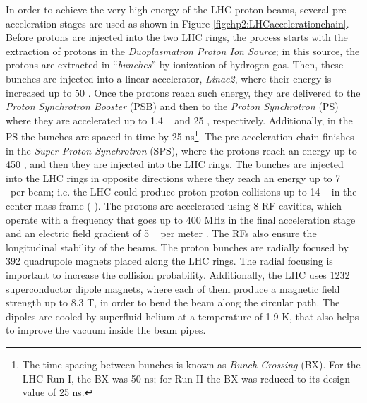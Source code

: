 In order to achieve the very high energy of the LHC proton beams, several
pre-acceleration stages are used as shown in Figure \ref{figchp2:LHCaccelerationchain}. Before 
protons are injected into the two LHC rings, the process starts 
with the extraction of protons in the \textit{Duoplasmatron 
Proton Ion Source}; in this source, the protons are extracted in ``\textit{bunches}'' 
by ionization of hydrogen gas. Then, these bunches are 
injected into a linear accelerator, \textit{Linac2}, where 
their energy is increased up to 50 \MeV. Once the protons 
reach such energy, they are delivered to the 
\textit{Proton Synchrotron Booster} (PSB) and then to the \textit{Proton Synchrotron} (PS) 
where they are accelerated up to 1.4 \GeV~ and 25 \GeV, respectively. Additionally,
in the PS the bunches are spaced in time by 25 ns\footnote[1]{The time spacing between 
bunches is known as \textit{Bunch Crossing} (BX). For the LHC Run I, the BX was 50 ns; for Run II 
the BX was reduced to its design value of 25 ns.}. The pre-acceleration chain 
finishes in the \textit{Super Proton Synchrotron} (SPS), where the protons reach 
an energy up to 450 \GeV, and then they are injected into the LHC rings. The bunches are 
injected into the LHC rings in opposite directions where they reach an 
energy up to 7 \TeV~per beam; i.e. the LHC could produce proton-proton collisions 
up to 14 \TeV~ in the center-mass frame ( \TeV). The protons are accelerated 
using 8 RF cavities, which operate with a frequency 
that goes up to 400 MHz in the final acceleration stage and an electric field 
gradient of 5 \MeV~ per meter \cite{chp2:LHCTDR}. The RFs also ensure the longitudinal stability of the beams. The 
proton bunches are radially focused by 392 quadrupole magnets placed along the 
LHC rings. The radial focusing is important to increase the collision probability. Additionally, the 
LHC uses 1232 superconductor dipole magnets, where each of them produce a magnetic field strength 
up to 8.3 T, in order to bend the beam along the circular path. The dipoles 
are cooled by superfluid helium at a temperature of 1.9 K, that also helps to improve the vacuum
inside the beam pipes. 

